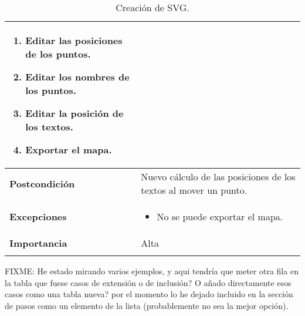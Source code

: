 \begin{longtable}[H]{@{}l|l@{}}
\begin{minipage}[t]{0.71\columnwidth}
\begin{enumerate}
			\item Editar las posiciones de los puntos.
			\item Editar los nombres de los puntos.
			\item Editar la posición de los textos.
			\item Exportar el mapa.
		\end{enumerate}
	\end{minipage}\tabularnewline
	\midrule
	\begin{minipage}[t]{0.23\columnwidth}\raggedright\strut
		\textbf{Postcondición}\strut
	\end{minipage} & \begin{minipage}[t]{0.71\columnwidth}\raggedright\strut
		Nuevo cálculo de las posiciones de los textos al mover un punto.\strut
	\end{minipage}\tabularnewline
	\midrule
	\begin{minipage}[t]{0.23\columnwidth}\raggedright\strut
		\textbf{Excepciones}\strut
	\end{minipage} & \begin{minipage}[t]{0.71\columnwidth}\raggedright\strut
		\begin{itemize}
			\tightlist
			\item No se puede exportar el mapa.
		\end{itemize}
	\end{minipage}\tabularnewline
	\midrule
	\begin{minipage}[t]{0.23\columnwidth}\raggedright\strut
		\textbf{Importancia}\strut
	\end{minipage} & \begin{minipage}[t]{0.71\columnwidth}\raggedright\strut
		Alta\strut
	\end{minipage}\tabularnewline
	\bottomrule
	\caption{Creación de SVG.}
	\label{cu:3}
\end{longtable}
\newpage


FIXME: He estado mirando varios ejemplos, y aqui tendría que meter otra fila en la tabla que fuese casos de extensión o de inclusión?
O añado directamente esos casos como una tabla nueva? por el momento lo he dejado incluido en la sección de pasos como un elemento de la lista (probablemente no sea la mejor opción).
